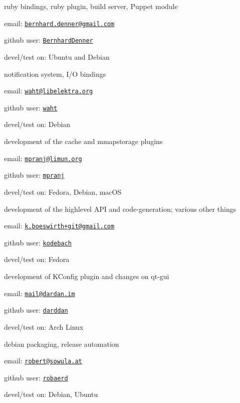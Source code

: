 ruby bindings, ruby plugin, build server, Puppet module


\begin{DoxyItemize}
\item email\+: \href{mailto:bernhard.denner@gmail.com}{\tt bernhard.\+denner@gmail.\+com}
\item github user\+: \href{https://github.com/BernhardDenner}{\tt Bernhard\+Denner}
\item devel/test on\+: Ubuntu and Debian
\end{DoxyItemize}

notification system, I/O bindings


\begin{DoxyItemize}
\item email\+: \href{mailto:waht@libelektra.org}{\tt waht@libelektra.\+org}
\item github user\+: \href{https://github.com/waht}{\tt waht}
\item devel/test on\+: Debian
\end{DoxyItemize}

development of the cache and mmapstorage plugins


\begin{DoxyItemize}
\item email\+: \href{mailto:mpranj@limun.org}{\tt mpranj@limun.\+org}
\item github user\+: \href{https://github.com/mpranj}{\tt mpranj}
\item devel/test on\+: Fedora, Debian, mac\+OS
\end{DoxyItemize}

development of the highlevel A\+PI and code-\/generation; various other things


\begin{DoxyItemize}
\item email\+: \href{mailto:k.boeswirth+git@gmail.com}{\tt k.\+boeswirth+git@gmail.\+com}
\item github user\+: \href{https://github.com/kodebach}{\tt kodebach}
\item devel/test on\+: Fedora
\end{DoxyItemize}

development of K\+Config plugin and changes on qt-\/gui


\begin{DoxyItemize}
\item email\+: \href{mailto:mail@dardan.im}{\tt mail@dardan.\+im}
\item github user\+: \href{https://github.com/darddan}{\tt darddan}
\item devel/test on\+: Arch Linux
\end{DoxyItemize}

debian packaging, release automation


\begin{DoxyItemize}
\item email\+: \href{mailto:robert@sowula.at}{\tt robert@sowula.\+at}
\item github user\+: \href{https://github.com/robaerd}{\tt robaerd}
\item devel/test on\+: Debian, Ubuntu 
\end{DoxyItemize}